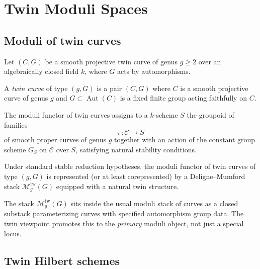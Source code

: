\documentclass[11pt,a4paper]{article}
\numberwithin{equation}{section}
\DeclareMathOperator{\Aut}{Aut}
\begin{document}
	\section{Twin Moduli Spaces}
	\label{sec:moduli}
	
	\subsection{Moduli of twin curves}
	
	Let $(C,G)$ be a smooth projective twin curve of genus $g\ge 2$ over an algebraically closed field $k$,
	where $G$ acts by automorphisms.
	
	\begin{definition}
		A \emph{twin curve} of type $(g,G)$ is a pair $(C,G)$ where $C$ is a smooth projective curve of genus $g$
		and $G\subset\Aut(C)$ is a fixed finite group acting faithfully on $C$.
	\end{definition}
	
	\begin{definition}
		The moduli functor of twin curves assigns to a $k$-scheme $S$ the groupoid of families
		\[
		\pi:\mathcal{C}\to S
		\]
		of smooth proper curves of genus $g$ together with an action of the constant group scheme $G_S$ on $\mathcal{C}$
		over $S$, satisfying natural stability conditions.
	\end{definition}
	
	\begin{theorem}
		Under standard stable reduction hypotheses, the moduli functor of twin curves of type $(g,G)$ is represented (or
		at least corepresented) by a Deligne--Mumford stack $\mathcal{M}_{g}^{\mathrm{tw}}(G)$ equipped with a natural 
		twin structure.
	\end{theorem}
	
	\begin{remark}
		The stack $\mathcal{M}_{g}^{\mathrm{tw}}(G)$ sits inside the usual moduli stack of curves as a closed substack
		parameterizing curves with specified automorphism group data. The twin viewpoint promotes this to the 
		\emph{primary} moduli object, not just a special locus.
	\end{remark}
	
	\subsection{Twin Hilbert schemes}
	
\end{document}
